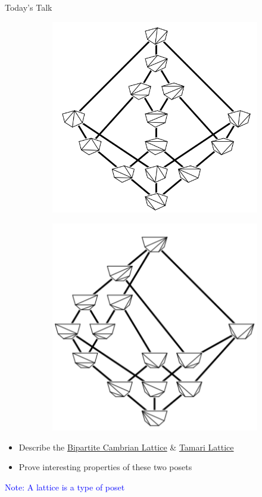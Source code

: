 \documentclass[xcolor=x11names,compress,t]{beamer}
\begin{document}
\begin{frame}{Today's Talk}
    \begin{figure}
    \centering
        \begin{subfigure}{.5\textwidth}
        \centering
        \includegraphics[width=0.6\linewidth]{ExCambrianLattice.png}
        \end{subfigure}%
        \begin{subfigure}{.5\textwidth}
        \centering
        \includegraphics[width=0.6\linewidth]{Capture1.PNG}
        \end{subfigure}
    \label{fig:test}
    \end{figure}
    \begin{itemize}
        \item Describe the \underline{Bipartite Cambrian Lattice} \& \underline{Tamari Lattice}
        \item Prove interesting properties of these two posets
    \end{itemize}
    \vspace{1cm}
    \textcolor{blue}{Note: A lattice is a type of poset}
\end{frame}
\end{document}
